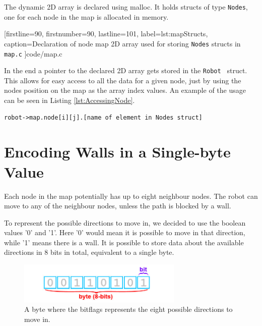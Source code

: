 The dynamic 2D array is declared using malloc. 
It holds structs of type {\tt Nodes}, one for each node in the map is allocated in memory.


[firstline=90,			%
firstnumber=90,		%
lastline=101,			%
label=lst:mapStructs,	%
caption={Declaration of node map 2D array used for storing {\tt Nodes} structs in {\tt map.c}}
]{code/map.c}

In the end a pointer to the declared 2D array gets stored in the {\tt Robot } struct.
This allows for easy access to all the data for a given node, just by using the nodes position on the map as the array index values. An example of the usage can be seen in Listing \ref{lst:AccessingNode}. 

\begin{lstlisting}[caption={Example of accessing a node in the node map stored in a 2D array in {\tt map.c}},label={lst:AccessingNode}]
robot->map.node[i][j].[name of element in Nodes struct]
\end{lstlisting}

\section{Encoding Walls in a Single-byte Value}
\label{sec:map_hex}
Each node in the map potentially has up to eight neighbour nodes. 
The robot can move to any of the neighbour nodes, unless the path is blocked by a wall.

To represent the possible directions to move in, we decided to use the boolean values '0' and '1'. 
Here '0' would mean it is possible to move in that direction, while '1' means there is a wall.
It is possible to store data about the available directions in 8 bits in total, equivalent to a single byte.

\begin{figure}[htp]
    \centering
        \includegraphics[width=0.70\textwidth]{figures/map/bitbyte.png}%
    \caption{A byte where the bitflags represents the eight possible directions to move in.}
    \label{fig:bitbyte}
\end{figure}


